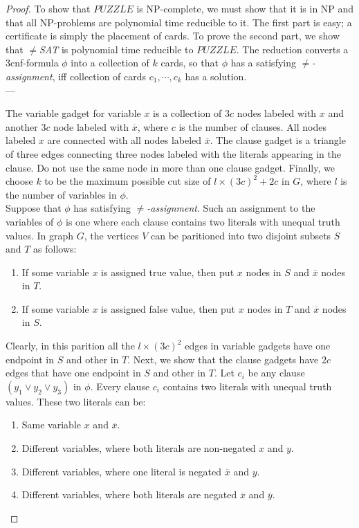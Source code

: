 \documentclass[11pt]{article}
\begin{document}
\begin{proof}
To show that $PUZZLE$ is NP-complete, we must show that it is in NP and that all NP-problems are polynomial time reducible to it. The first part is easy; a certificate is simply the placement of cards. To prove the second part, we show that $\neq$\textit{SAT} is polynomial time reducible to $PUZZLE$. The reduction converts a 3cnf-formula $\phi$ into a collection of $k$ cards, so that $\phi$ has a satisfying $\neq$\textit{-assignment}, iff collection of cards $c_1,\cdots, c_k$ has a solution. \\

---

The variable gadget for variable $x$ is a collection of $3c$ nodes labeled with $x$ and another $3c$ node labeled with $\overline{x}$, where $c$ is the number of clauses. All nodes labeled $x$ are connected with all nodes labeled $\overline{x}$. The clause gadget is a triangle of three edges connecting three nodes labeled with the literals appearing in the clause. Do not use the same node in more than one clause gadget. Finally, we choose $k$ to be the maximum possible cut size of $l \times (3c)^2 + 2c$ in $G$, where $l$ is the number of variables in $\phi$. \\

Suppose that $\phi$ has satisfying $\neq$\textit{-assignment}. Such an assignment to the variables of $\phi$ is one where each clause contains two literals with unequal truth values. In graph $G$, the vertices $V$ can be paritioned into two disjoint subsets $S$ and $T$ as follows:
\begin{enumerate}
\item If some variable $x$ is assigned true value, then put $x$ nodes in $S$ and $\overline{x}$ nodes in $T$.
\item If some variable $x$ is assigned false value, then put $x$ nodes in $T$ and $\overline{x}$ nodes in $S$.
\end{enumerate}

Clearly, in this parition all the $l \times (3c)^2$ edges in variable gadgets have one endpoint in $S$ and other in $T$. Next, we show that the clause gadgets have $2c$ edges that have one endpoint in $S$ and other in $T$. Let $c_i$ be any clause $(y_1 \vee y_2 \vee y_3)$ in $\phi$. Every clause $c_i$ contains two literals with unequal truth values. These two literals can be:
\begin{enumerate}
\item Same variable $x$ and $\overline{x}$.
\item Different variables, where both literals are non-negated $x$ and $y$.
\item Different variables, where one literal is negated $\overline{x}$ and $y$.
\item Different variables, where both literals are negated $\overline{x}$ and $\overline{y}$.
\end{enumerate}


\end{proof}
\end{document}

